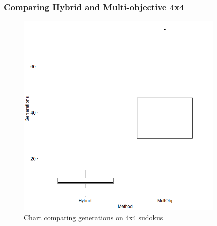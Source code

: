 \documentclass[a4paper,11pt]{article}
\begin{document}
\subsubsection{Comparing Hybrid and Multi-objective 4x4}

\begin{figure}[H]
	\centering
	\includegraphics[height=10cm,width=10cm]{./Diagrams/barChartComparing4x4}
	\caption{Chart comparing generations on 4x4 sudokus}
\end{figure}
\end{document}
